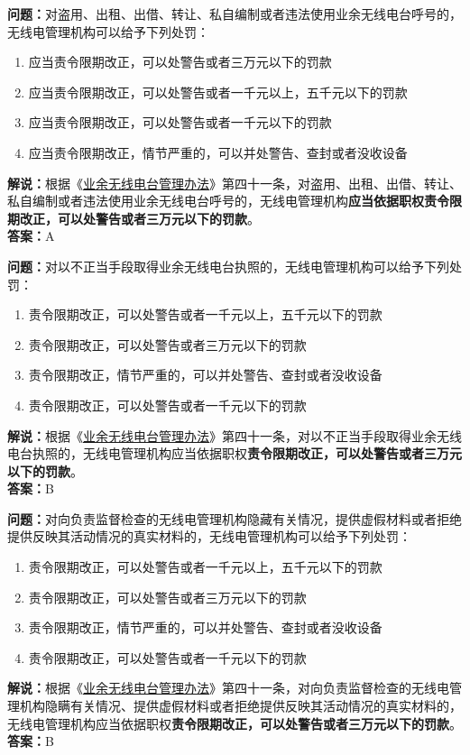\textbf{问题：}对盗用、出租、出借、转让、私自编制或者违法使用业余无线电台呼号的，无线电管理机构可以给予下列处罚：
\begin{enumerate}[label=\Alph*), leftmargin=1cm]
  \item 应当责令限期改正，可以处警告或者三万元以下的罚款
  \item 应当责令限期改正，可以处警告或者一千元以上，五千元以下的罚款
  \item 应当责令限期改正，可以处警告或者一千元以下的罚款
  \item 应当责令限期改正，情节严重的，可以并处警告、查封或者没收设备
\end{enumerate}
\textbf{解说：}根据《\href{https://www.miit.gov.cn/jgsj/zfs/bmgz/art/2020/art_147b69815b3641caad9047735f94c860.html}{业余无线电台管理办法}》第四十一条，对盗用、出租、出借、转让、私自编制或者违法使用业余无线电台呼号的，无线电管理机构\textbf{应当依据职权责令限期改正，可以处警告或者三万元以下的罚款}。\\
\textbf{答案：}A


\textbf{问题：}对以不正当手段取得业余无线电台执照的，无线电管理机构可以给予下列处罚：
\begin{enumerate}[label=\Alph*), leftmargin=1cm]
  \item 责令限期改正，可以处警告或者一千元以上，五千元以下的罚款
  \item 责令限期改正，可以处警告或者三万元以下的罚款
  \item 责令限期改正，情节严重的，可以并处警告、查封或者没收设备
  \item 责令限期改正，可以处警告或者一千元以下的罚款
\end{enumerate}
\textbf{解说：}根据《\href{https://www.miit.gov.cn/jgsj/zfs/bmgz/art/2020/art_147b69815b3641caad9047735f94c860.html}{业余无线电台管理办法}》第四十一条，对以不正当手段取得业余无线电台执照的，无线电管理机构应当依据职权\textbf{责令限期改正，可以处警告或者三万元以下的罚款}。\\
\textbf{答案：}B


\textbf{问题：}对向负责监督检查的无线电管理机构隐藏有关情况，提供虚假材料或者拒绝提供反映其活动情况的真实材料的，无线电管理机构可以给予下列处罚：
\begin{enumerate}[label=\Alph*), leftmargin=1cm]
  \item 责令限期改正，可以处警告或者一千元以上，五千元以下的罚款
  \item 责令限期改正，可以处警告或者三万元以下的罚款
  \item 责令限期改正，情节严重的，可以并处警告、查封或者没收设备
  \item 责令限期改正，可以处警告或者一千元以下的罚款
\end{enumerate}
\textbf{解说：}根据《\href{https://www.miit.gov.cn/jgsj/zfs/bmgz/art/2020/art_147b69815b3641caad9047735f94c860.html}{业余无线电台管理办法}》第四十一条，对向负责监督检查的无线电管理机构隐瞒有关情况、提供虚假材料或者拒绝提供反映其活动情况的真实材料的，无线电管理机构应当依据职权\textbf{责令限期改正，可以处警告或者三万元以下的罚款}。\\
\textbf{答案：}B


